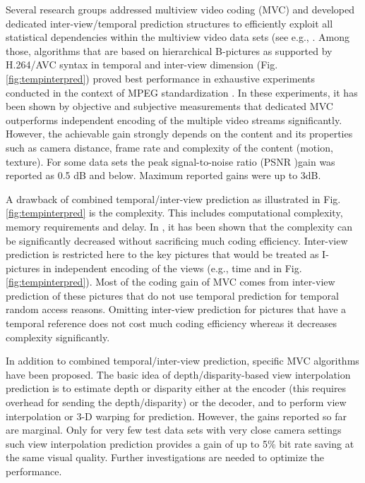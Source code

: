 Several research groups addressed multiview video coding (MVC) and developed dedicated inter-view/temporal prediction structures to efficiently exploit all statistical dependencies within the multiview video data sets (see e.g., . Among those, algorithms that are based on hierarchical B-pictures  as supported by H.264/AVC syntax in temporal and inter-view dimension (Fig. \ref{fig:tempinterpred}) proved best performance in exhaustive experiments conducted in the context of MPEG standardization . In these experiments, it has been shown by objective and subjective measurements that dedicated MVC outperforms independent encoding of the multiple video streams significantly. However, the achievable gain strongly depends on the content and its properties such as camera distance, frame rate and complexity of the content (motion, texture). For some data sets the peak signal-to-noise ratio (PSNR )gain was reported as 0.5 dB and below. Maximum reported gains were up to 3dB.

A drawback of combined temporal/inter-view prediction as illustrated in Fig. \ref{fig:tempinterpred} is the complexity. This includes computational complexity, memory requirements and delay. In , it has been shown that the complexity can be significantly decreased without sacrificing much coding efficiency. Inter-view prediction is restricted here to the key pictures that would be treated as I-pictures in independent encoding of the views (e.g., time and in Fig. \ref{fig:tempinterpred}). Most of the coding gain of MVC comes from inter-view prediction of these pictures that do not use temporal prediction for temporal random access reasons. Omitting inter-view prediction for pictures that have a temporal reference does not cost much coding efficiency whereas it decreases complexity significantly.

In addition to combined temporal/inter-view prediction, specific MVC algorithms have been proposed. The basic idea of depth/disparity-based view interpolation prediction  is to estimate depth or disparity either at the encoder (this requires overhead for sending the depth/disparity) or the decoder, and to perform view interpolation or 3-D warping for prediction. However, the gains reported so far are marginal. Only for very few test data sets with very close camera settings such view interpolation prediction provides a gain of up to 5\% bit rate saving at the same visual quality. Further investigations are needed to optimize the performance.


